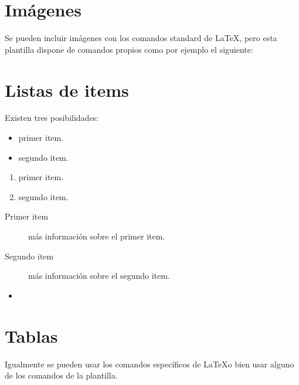 \section{Imágenes}

Se pueden incluir imágenes con los comandos standard de \LaTeX, pero esta plantilla dispone de comandos propios como por ejemplo el siguiente:




\section{Listas de items}

Existen tres posibilidades:

\begin{itemize}
	\item primer item.
	\item segundo item.
\end{itemize}

\begin{enumerate}
	\item primer item.
	\item segundo item.
\end{enumerate}

\begin{description}
	\item[Primer item] más información sobre el primer item.
	\item[Segundo item] más información sobre el segundo item.
\end{description}
	
\begin{itemize}
\item 
\end{itemize}

\section{Tablas}

Igualmente se pueden usar los comandos específicos de \LaTeX o bien usar alguno de los comandos de la plantilla.

